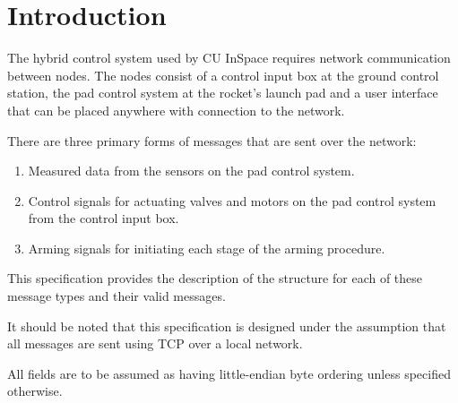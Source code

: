 \section{Introduction}

The hybrid control system used by CU InSpace requires network communication between nodes. The nodes consist of a
control input box at the ground control station, the pad control system at the rocket's launch pad and a user interface
that can be placed anywhere with connection to the network.

There are three primary forms of messages that are sent over the network:

\begin{enumerate}
    \item Measured data from the sensors on the pad control system.
    \item Control signals for actuating valves and motors on the pad control system from the control input box.
    \item Arming signals for initiating each stage of the arming procedure.
\end{enumerate}

This specification provides the description of the structure for each of these message types and their valid messages.

It should be noted that this specification is designed under the assumption that all messages are sent using TCP over a
local network.

All fields are to be assumed as having little-endian byte ordering unless specified otherwise.
